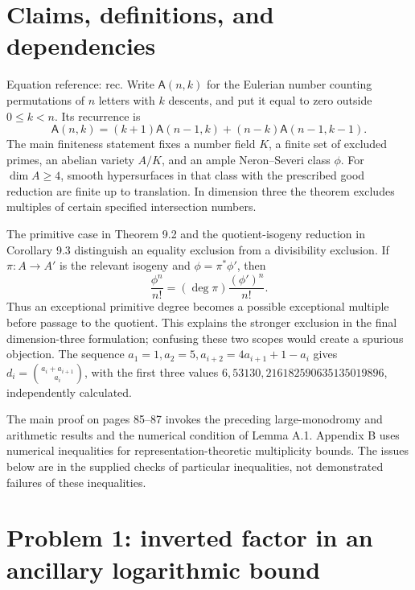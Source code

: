 \documentclass[10pt]{article}
\begin{document}
\section*{Claims, definitions, and dependencies}
Equation reference: rec. Write \(\mathsf A(n,k)\) for the Eulerian number counting permutations of \(n\) letters with \(k\) descents, and put it equal to zero outside \(0\leq k<n\). Its recurrence is \[
 \mathsf A(n,k)=(k+1)\mathsf A(n-1,k)+(n-k)\mathsf A(n-1,k-1).\] The main finiteness statement fixes a number field \(K\), a finite set of excluded primes, an abelian variety \(A/K\), and an ample Neron–Severi class \(\phi\). For \(\dim A\geq4\), smooth hypersurfaces in that class with the prescribed good reduction are finite up to translation. In dimension three the theorem excludes multiples of certain specified intersection numbers.\par
The primitive case in Theorem 9.2 and the quotient-isogeny reduction in Corollary 9.3 distinguish an equality exclusion from a divisibility exclusion. If \(\pi:A\to A'\) is the relevant isogeny and \(\phi=\pi^*\phi'\), then \[\frac{\phi^n}{n!}=(\deg\pi)\frac{(\phi')^n}{n!}.\] Thus an exceptional primitive degree becomes a possible exceptional multiple before passage to the quotient. This explains the stronger exclusion in the final dimension-three formulation; confusing these two scopes would create a spurious objection. The sequence \(a_1=1,a_2=5,a_{i+2}=4a_{i+1}+1-a_i\) gives \(d_i=\binom{a_i+a_{i+1}}{a_i}\), with the first three values \(6,53130,216182590635135019896\), independently calculated.\par
The main proof on pages 85–87 invokes the preceding large-monodromy and arithmetic results and the numerical condition of Lemma A.1. Appendix B uses numerical inequalities for representation-theoretic multiplicity bounds. The issues below are in the supplied checks of particular inequalities, not demonstrated failures of these inequalities.\par
\section*{Problem 1: inverted factor in an ancillary logarithmic bound}
\end{document}
